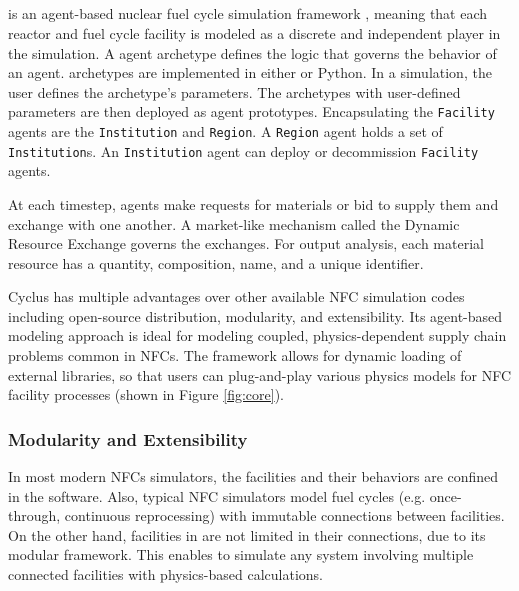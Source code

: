 \subsection{\Cyclus}

\Cyclus is an agent-based nuclear fuel cycle simulation framework 
\cite{huff_fundamental_2016}, meaning
that each reactor and fuel cycle facility is modeled as a discrete and independent
player in the simulation.
A \Cyclus agent archetype defines the logic that governs the behavior
of an agent. 
\Cyclus archetypes are implemented in  either \CC  or Python.
In a simulation, the user defines the archetype's
parameters. The archetypes with user-defined parameters are then deployed
as agent prototypes.  Encapsulating the \texttt{Facility} agents are the \texttt{Institution} and \texttt{Region}.
A \texttt{Region} agent holds a set of \texttt{Institution}s. 
An \texttt{Institution} agent can deploy or decommission \texttt{Facility} agents.

At each timestep,
agents make requests for materials or bid to supply them and exchange
with one another. A market-like mechanism called the Dynamic Resource Exchange
\cite{gidden_methodology_2016} governs the exchanges.
For output analysis, each material resource has a quantity, composition, name, and a unique identifier.

Cyclus has multiple advantages over other available
\gls{NFC} simulation codes including open-source distribution, modularity,
and extensibility. Its agent-based modeling approach
is ideal for modeling coupled, physics-dependent
supply chain problems common in \glspl{NFC}.
The framework allows for dynamic loading of 
external libraries, so that users can plug-and-play
various physics models for \gls{NFC} facility processes (shown in Figure \ref{fig:core}).


\subsubsection{Modularity and Extensibility}

In most modern \glspl{NFC} simulators, the facilities and their
behaviors are confined in the software.
Also, typical \gls{NFC} simulators model
fuel cycles (e.g. once-through, continuous reprocessing)
with immutable connections between facilities. On the other hand,
facilities in \Cyclus are not limited in their connections,
due to its modular framework.
This enables \Cyclus to simulate any system
involving multiple connected facilities with physics-based
calculations.


